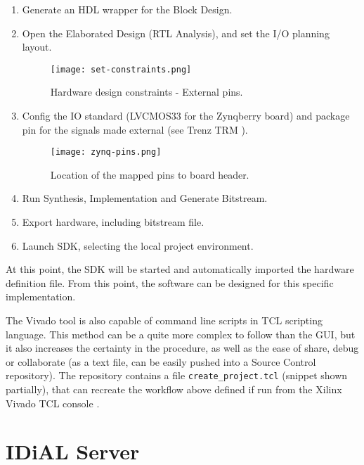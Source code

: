 \begin{enumerate}
	\item Generate an HDL wrapper for the Block Design.
	\item Open the Elaborated Design (RTL Analysis), and set the I/O planning layout.
	\begin{figure}[h!]
		\centering
		\texttt{[image: set-constraints.png]}
		\caption{Hardware design constraints - External pins.}
		\label{fig:set-constraints}
	\end{figure}
	\item Config the IO standard (LVCMOS33 for the Zynqberry board) and package pin for the signals made external (see Trenz TRM \cite{zynq-trm}).
	\begin{figure}[h!]
		\centering
		\texttt{[image: zynq-pins.png]}
		\caption{Location of the mapped pins to board header.}
		\label{fig:zynq-pins}
	\end{figure}
	\item Run Synthesis, Implementation and Generate Bitstream.
	\item Export hardware, including bitstream file.
	\item Launch SDK, selecting the local project environment.
\end{enumerate}

At this point, the SDK will be started and automatically imported the hardware definition file. From this point, the software can be designed for this specific implementation.

The Vivado tool is also capable of command line scripts in TCL scripting language. This method can be a quite more complex to follow than the GUI, but it also increases the certainty in the procedure, as well as the ease of share, debug or collaborate (as a text file, can be easily pushed into a Source Control repository). The repository contains a file \texttt{create\_project.tcl} (snippet shown partially), that can recreate the workflow above defined if run from the Xilinx Vivado TCL console \cite{UG835}.



\section{IDiAL Server}

